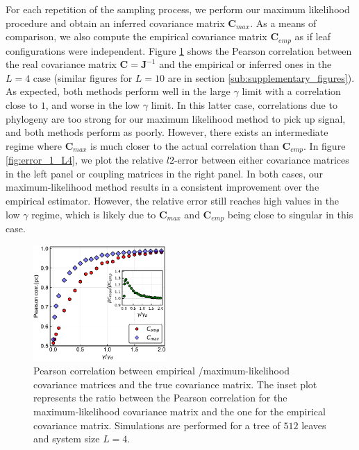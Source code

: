 \documentclass[preprint,amsmath,amssymb,superscriptaddress,showpacs,pre]{revtex4-1}
\begin{document}
For each repetition of the sampling process, we perform our maximum likelihood procedure and obtain an inferred covariance matrix $\bm{C}_{max}$. 
As a means of comparison, we also compute the empirical covariance matrix $\bm{C}_{emp}$ as if leaf configurations were independent. 
Figure \ref{fig:pears_L4} shows the Pearson correlation between the real covariance matrix $\bm{C}=\bm{J}^{-1}$ and the empirical or inferred ones in the $L=4$ case (similar figures for $L=10$ are in section \ref{sub:supplementary_figures}). 
As expected, both methods perform well in the large $\gamma$ limit with a correlation close to $1$, and worse in the low $\gamma$ limit. 
In this latter case, correlations due to phylogeny are too strong for our maximum likelihood method to pick up signal, and both methods perform as poorly. 
However, there exists an intermediate regime where $\bm{C}_{max}$ is much closer to the actual correlation than  $\bm{C}_{emp}$. 
In figure \ref{fig:error_1_L4}, we plot the relative $l2$-error between either covariance matrices in the left panel or coupling matrices in the right panel. 
In both cases, our maximum-likelihood method results in a consistent improvement over the empirical estimator. 
However, the relative error still reaches high values in the low $\gamma$ regime, which is likely due to $\bm{C}_{max}$ and $\bm{C}_{emp}$ being close to singular in this case. 

\begin{figure}[!htb]
	\centering
	\includegraphics[keepaspectratio=true,width=0.45\textwidth]{Figures/corr_C_L4_balanced_tree_100_rep.pdf}
	\caption{ Pearson correlation between empirical /maximum-likelihood   covariance matrices and the true covariance matrix. The inset plot represents the ratio between the Pearson correlation for the  maximum-likelihood covariance matrix and the one for the empirical covariance matrix. Simulations are performed for a tree of $512$ leaves  and  system size $L=4$.}
	\label{fig:pears_L4}
\end{figure}
\end{document}
